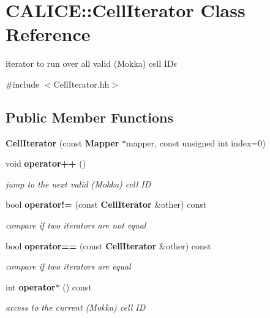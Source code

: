 \section{C\-A\-L\-I\-C\-E\-:\-:Cell\-Iterator Class Reference}
\label{classCALICE_1_1CellIterator}


iterator to run over all valid (Mokka) cell I\-Ds  




{\ttfamily \#include $<$Cell\-Iterator.\-hh$>$}

\subsection*{Public Member Functions}
\begin{DoxyCompactItemize}
\item 
{\bfseries Cell\-Iterator} (const {\bf Mapper} $\ast$mapper, const unsigned int index=0)\label{classCALICE_1_1CellIterator_a55f049561c6efd49d8ac05d8fd1892d9}

\item 
void {\bf operator++} ()\label{classCALICE_1_1CellIterator_aa8632dfb854dab0d3afa78eee2d3e4fe}

\begin{DoxyCompactList}\small\item\em jump to the next valid (Mokka) cell I\-D \end{DoxyCompactList}\item 
bool {\bf operator!=} (const {\bf Cell\-Iterator} \&other) const \label{classCALICE_1_1CellIterator_afad05336400eeb213d96a7bb837e47da}

\begin{DoxyCompactList}\small\item\em compare if two iterators are not equal \end{DoxyCompactList}\item 
bool {\bf operator==} (const {\bf Cell\-Iterator} \&other) const \label{classCALICE_1_1CellIterator_a16d97b72ac170520e4ddbcb54ae2b7ae}

\begin{DoxyCompactList}\small\item\em compare if two iterators are equal \end{DoxyCompactList}\item 
int {\bf operator$\ast$} () const 
\begin{DoxyCompactList}\small\item\em access to the current (Mokka) cell I\-D \end{DoxyCompactList}\end{DoxyCompactItemize}
